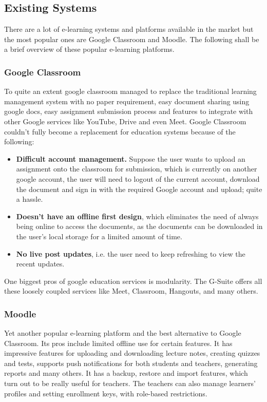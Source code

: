\subsection{Existing Systems}

There are a lot of e-learning systems and platforms available in the market 
but the most popular ones are Google Classroom and Moodle. 
The following shall be a brief overview of these popular e-learning platforms.

\subsubsection{Google Classroom}
To quite an extent google classroom managed to replace the traditional 
learning management system with no paper requirement, easy document sharing using google docs, 
easy assignment submission process and features to integrate with other Google services 
like YouTube, Drive and even Meet. 
Google Classroom couldn't fully become a replacement for education systems because of the following:

\begin{itemize}
    \item \textbf{Difficult account management.} Suppose the user wants to upload an assignment onto the classroom for submission, 
    which is currently on another google account, the user will need to logout of the current account, 
    download the document and sign in with the required Google account and upload; quite a hassle.
    \item \textbf{Doesn’t have an offline first design}, which eliminates the need of always being online to access the documents, 
    as the documents can be downloaded in the user’s local storage for a limited amount of time.
    \item \textbf{No live post updates}, i.e. the user need to keep refreshing to view the recent updates.
\end{itemize}

One biggest pros of google education services is modularity. The G-Suite offers all these 
loosely coupled services like Meet, Classroom, Hangouts, and many others.

\subsubsection{Moodle}
Yet another popular e-learning platform and the best alternative to Google Classroom. 
Its pros include limited offline use for certain features. It has impressive features 
for  uploading and downloading lecture notes, creating quizzes and tests, supports push 
notifications for both students and teachers, generating reports and many others. 
It has a  backup, restore and import features, which turn out to be really useful for teachers. 
The teachers can also manage learners' profiles and setting enrollment keys, with role-based restrictions.

